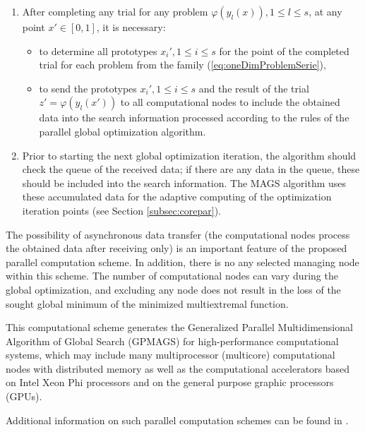 \documentclass{aims}
\theoremstyle{definition}
\begin{document}
\begin{enumerate}
\begin{enumerate}
\begin{itemize}
    \end{itemize}
    \item After completing any trial for any problem \(\varphi(y_l(x)),1\leq l\leq s\),
    at any point \(x'\in[0,1]\), it is necessary:
    \begin{itemize}
      \item to determine all prototypes \(x_i',1\leq i\leq s\) for the point of the
      completed trial for each problem from the family (\ref{eq:oneDimProblemSerie}),
      \item to send the prototypes \(x_i',1\leq i\leq s\) and the result of the trial
      \(z'=\varphi(y_l(x'))\) to all computational nodes to include the obtained data into
      the search information processed according to the rules of the parallel global optimization algorithm.
    \end{itemize}
    \item Prior to starting the next global optimization iteration, the algorithm
    should check the queue of the received data; if there are any data in the queue,
    these should be included into the search information. The MAGS algorithm uses these
    accumulated data for the adaptive computing of the optimization iteration points (see Section \ref{subsec:corepar}).
\end{enumerate}
\end{enumerate}
\par
The possibility of asynchronous data transfer (the computational nodes process the obtained
data after receiving only) is an important feature of the proposed parallel computation scheme.
In addition, there is no any selected managing node within this scheme. The number of
computational nodes can vary during the global optimization, and excluding any node does not result
in the loss of the sought global minimum of the minimized multiextremal function.
\par
This computational scheme generates the Generalized Parallel Multidimensional Algorithm of
Global Search (GPMAGS) for high-performance computational systems, which may include many
multiprocessor (multicore) computational nodes with distributed memory as well as the
computational accelerators based on Intel Xeon Phi processors and on the general purpose graphic processors (GPUs).
\par
Additional information on such parallel computation schemes can be found in \cite{gergelSidorov2015}.
\end{document}
